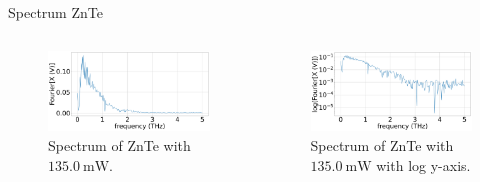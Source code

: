 \documentclass[aspectratio=1610, 9pt]{beamer}
\begin{document}
\begin{frame}{Spectrum ZnTe}
  \begin{columns}
    \begin{column}{.5\textwidth}
  \begin{figure}
    \includegraphics[width=\textwidth]{images/2_11_30_20normalFX.pdf}
    \caption{\textcolor{tugreen}{Spectrum} of ZnTe with $\SI{135.0}{\milli\W}$.}
  \end{figure}
  \end{column}
  \begin{column}{.5\textwidth}
    \begin{figure}
      \includegraphics[width=\textwidth]{images/2_11_30_20normallog(FX).pdf}
      \caption{\textcolor{tugreen}{Spectrum} of ZnTe with $\SI{135.0}{\milli\W}$ with log y-axis.}
    \end{figure}    
  \end{column}
  \end{columns}
\end{frame}
\end{document}
